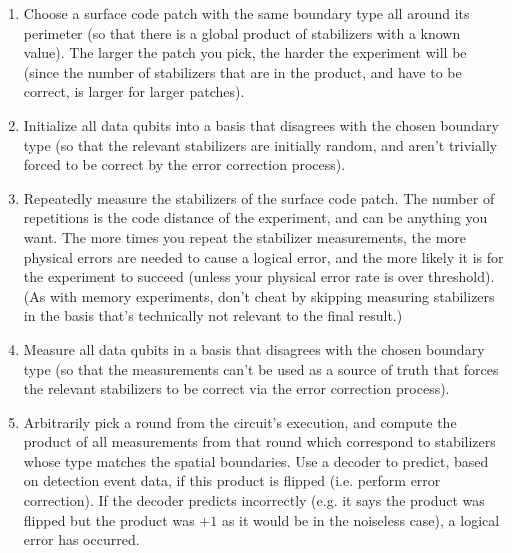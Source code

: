 \documentclass[onecolumn,unpublished,a4paper]{quantumarticle}
\theoremstyle{definition}
\theoremstyle{definition}
\theoremstyle{definition}
\begin{document}
\begin{enumerate}

\item Choose a surface code patch with the same boundary type all around its perimeter (so that there is a global product of stabilizers with a known value).
The larger the patch you pick, the harder the experiment will be (since the number of stabilizers that are in the product, and have to  be correct, is larger for larger patches).

\item Initialize all data qubits into a basis that disagrees with the chosen boundary type (so that the relevant stabilizers are initially random, and aren't trivially forced to be correct by the error correction process).

\item Repeatedly measure the stabilizers of the surface code patch.
The number of repetitions is the code distance of the experiment, and can be anything you want.
The more times you repeat the stabilizer measurements, the more physical errors are needed to cause a logical error, and the more likely it is for the experiment to succeed (unless your physical error rate is over threshold).
(As with memory experiments, don't cheat by skipping measuring stabilizers in the basis that's technically not relevant to the final result.)

\item Measure all data qubits in a basis that disagrees with the chosen boundary type (so that the measurements can't be used as a source of truth that forces the relevant stabilizers to be correct via the error correction process).

\item Arbitrarily pick a round from the circuit's execution, and compute the product of all measurements from that round which correspond to stabilizers whose type matches the spatial boundaries.
Use a decoder to predict, based on detection event data, if this product is flipped (i.e. perform error correction).
If the decoder predicts incorrectly (e.g. it says the product was flipped but the product was $+1$ as it would be in the noiseless case), a logical error has occurred.

\end{enumerate}
\end{document}
